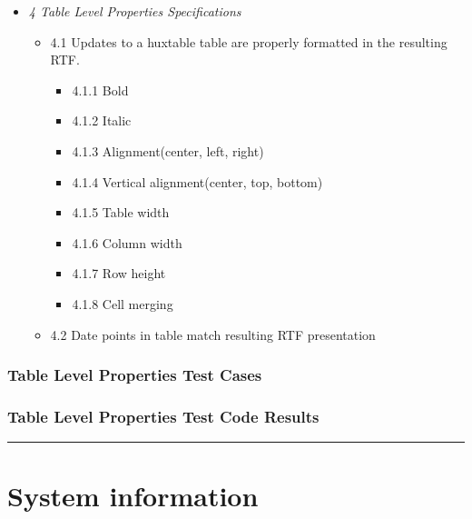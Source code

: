 \documentclass[]{article}
\providecommand{\tightlist}{%
  \setlength{\itemsep}{0pt}\setlength{\parskip}{0pt}}
\begin{document}
\begin{itemize}
\tightlist
\item
  \emph{4 Table Level Properties Specifications}

  \begin{itemize}
  \tightlist
  \item
    4.1 Updates to a huxtable table are properly formatted in the
    resulting RTF.

    \begin{itemize}
    \tightlist
    \item
      4.1.1 Bold
    \item
      4.1.2 Italic
    \item
      4.1.3 Alignment(center, left, right)
    \item
      4.1.4 Vertical alignment(center, top, bottom)
    \item
      4.1.5 Table width
    \item
      4.1.6 Column width
    \item
      4.1.7 Row height
    \item
      4.1.8 Cell merging
    \end{itemize}
  \item
    4.2 Date points in table match resulting RTF presentation
  \end{itemize}
\end{itemize}

\hypertarget{table-level-properties-test-cases}{%
\subsubsection{Table Level Properties Test
Cases}\label{table-level-properties-test-cases}}

\hypertarget{table-level-properties-test-code-results}{%
\subsubsection{Table Level Properties Test Code
Results}\label{table-level-properties-test-code-results}}

\begin{center}\rule{0.5\linewidth}{0.5pt}\end{center}

\hypertarget{system-information}{%
\section{System information}\label{system-information}}
\end{document}
